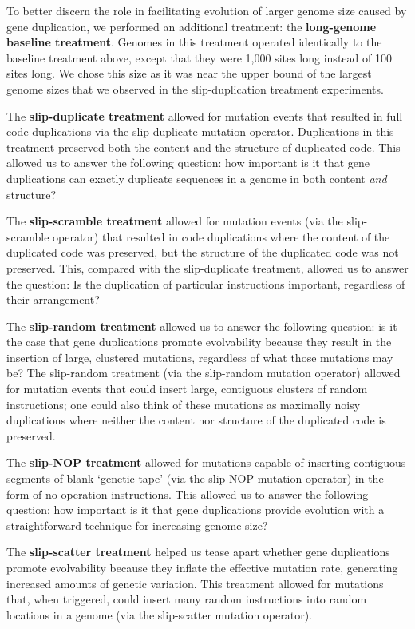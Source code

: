 To better discern the role in facilitating evolution of larger genome size caused by gene duplication, we performed an additional treatment: the \textbf{long-genome baseline treatment}.
Genomes in this treatment operated identically to the baseline treatment above, except that they were 1,000 sites long instead of 100 sites long.
We chose this size as it was near the upper bound of the largest genome sizes that we observed in the slip-duplication treatment experiments.

The \textbf{slip-duplicate treatment} allowed for mutation events that resulted in full code duplications via the slip-duplicate mutation operator. Duplications in this treatment preserved both the content and the structure of duplicated code. This allowed us to answer the following question: how important is it that gene duplications can exactly duplicate sequences in a genome in both content \textit{and} structure?

The \textbf{slip-scramble treatment} allowed for mutation events (via the slip-scramble operator) that resulted in code duplications where the content of the duplicated code was preserved, but the structure of the duplicated code was not preserved. This, compared with the slip-duplicate treatment, allowed us to answer the question: Is the duplication of particular instructions important, regardless of their arrangement?

The \textbf{slip-random treatment} allowed us to answer the following question: is it the case that gene duplications promote evolvability because they result in the insertion of large, clustered mutations, regardless of what those mutations may be? The slip-random treatment (via the slip-random mutation operator) allowed for mutation events that could insert large, contiguous clusters of random instructions; one could also think of these mutations as maximally noisy duplications where neither the content nor structure of the duplicated code is preserved.

The \textbf{slip-NOP treatment} allowed for mutations capable of inserting contiguous segments of blank `genetic tape' (via the slip-NOP mutation operator) in the form of no operation instructions. This allowed us to answer the following question: how important is it that gene duplications provide evolution with a straightforward technique for increasing genome size?

The \textbf{slip-scatter treatment} helped us tease apart whether gene duplications promote evolvability because they inflate the effective mutation rate, generating increased amounts of genetic variation. This treatment allowed for mutations that, when triggered, could insert many random instructions into random locations in a genome (via the slip-scatter mutation operator).

